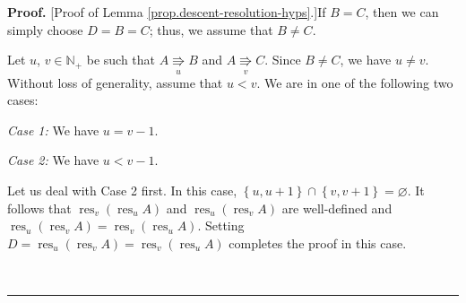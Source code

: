 \documentclass[numbers=enddot,12pt,final,onecolumn,notitlepage]{scrartcl}%
\theoremstyle{definition}
\newenvironment{proof}[1][Proof]{\noindent\textbf{#1.} }{\ \rule{0.5em}{0.5em}}
\begin{document}
\begin{proof}
[Proof of Lemma \ref{prop.descent-resolution-hyps}.]If $B=C$, then we can
simply choose $D=B=C$; thus, we assume that $B\neq C$.

Let $u$, $v \in\mathbb{N}_{+}$ be such that $A\underset{u}{\Rrightarrow}B$ and $A\underset{v}{\Rrightarrow}C$. Since $B \neq C$, we have $u \neq v$.
Without loss of generality, assume that $u<v$. We are in one of the following two cases:

\textit{Case 1:} We have $u=v-1$.

\textit{Case 2:} We have $u<v-1$.

Let us deal with Case 2 first. In this
case, $\left\{  u,u+1\right\}  \cap\left\{  v,v+1\right\}
=\varnothing$.
It follows that
$\operatorname*{res}\nolimits_{v}\left(  \operatorname*{res}\nolimits_{u}%
A\right)  $ and $\operatorname*{res}\nolimits_{u}%
\left(  \operatorname*{res}\nolimits_{v}A\right)  $ are well-defined and $\operatorname*{res}\nolimits_{u}\left(
\operatorname*{res}\nolimits_{v}A\right)  =\operatorname*{res}\nolimits_{v}%
\left(  \operatorname*{res}\nolimits_{u}A\right) $. Setting
$D=\operatorname*{res}\nolimits_{u}\left(  \operatorname*{res}\nolimits_{v}%
A\right)  =\operatorname*{res}\nolimits_{v}\left(  \operatorname*{res}%
\nolimits_{u}A\right)  $ completes the proof in this case.


\end{proof}
\end{document}
